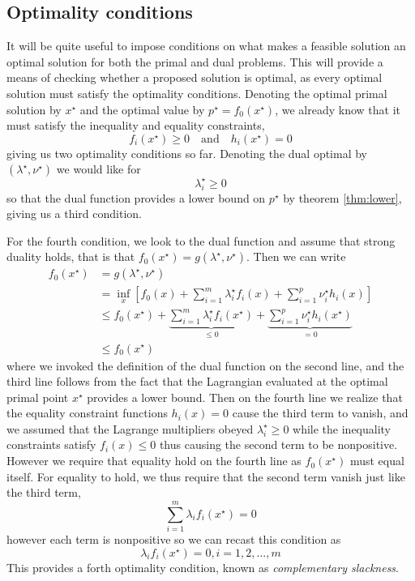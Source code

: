 \subsection{Optimality conditions} \label{ssec:KKT}
It will be quite useful to impose conditions on what makes a feasible solution an optimal solution for both the primal and dual problems. This will provide a means of checking whether a proposed solution is optimal, as every optimal solution must satisfy the optimality conditions. Denoting the optimal primal solution by $x^\star$ and the optimal value by $p^\star = f_0(x^\star)$, we already know that it must satisfy the inequality and equality constraints,
\begin{equation}
f_i(x^\star) \ge 0 \quad \mathrm{and} \quad h_i(x^\star) = 0
\end{equation}
giving us two optimality conditions so far. Denoting the dual optimal by $(\lambda^\star, \nu^\star)$ we would like for
\begin{equation}
\lambda_i^\star \ge 0
\end{equation}
so that the dual function provides a lower bound on $p^\star$ by theorem \ref{thm:lower}, giving us a third condition.

For the fourth condition, we look to the dual function and assume that strong duality holds, that is that $f_0(x^\star) = g(\lambda^\star, \nu^\star)$. Then we can write
\begin{align}
  f_0(x^\star) &= g(\lambda^\star, \nu^\star) \nonumber \\
  & = \inf_x \left[ f_0(x) + \sum_{i=1}^m \lambda_i^\star f_i(x) + \sum_{i=1}^p \nu_i^\star h_i(x) \right] \nonumber \\
  & \le f_0(x^\star)
    + \underbrace{\sum_{i=1}^m \lambda_i^\star f_i(x^\star)}_{\le 0}
    + \underbrace{\sum_{i=1}^p \nu_i^\star h_i(x^\star)}_{=0} \nonumber \\
  & \le f_0(x^\star)
\end{align}
where we invoked the definition of the dual function on the second line, and the third line follows from the fact that the Lagrangian evaluated at the optimal primal point $x^\star$ provides a lower bound. Then on the fourth line we realize that the equality constraint functions $h_i(x) = 0$ cause the third term to vanish, and we assumed that the Lagrange multipliers obeyed $\lambda_i^\star \ge 0$ while the inequality constraints satisfy $f_i(x) \le 0$ thus causing the second term to be nonpositive. However we require that equality hold on the fourth line as $f_0(x^\star)$ must equal itself. For equality to hold, we thus require that the second term vanish just like the third term,
\begin{equation}
  \sum_{i=1}^m \lambda_i f_i(x^\star) = 0
\end{equation}
however each term is nonpositive so we can recast this condition as
\begin{equation}
  \lambda_i f_i(x^\star) = 0, i = 1,2,\dots,m
\end{equation}
This provides a forth optimality condition, known as \emph{complementary slackness}.

